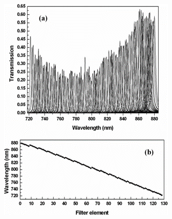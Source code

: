\begin{frame}[c]
\begin{columns}
\begin{column}{.3\textwidth}
\begin{figure}[H]
                \includegraphics[width=1.\textwidth]{figures/Concept of a high-resolution miniature spectrometer using an integrated filter array_2.png} %
            \end{figure}
        \end{column}
    \end{columns}
\end{frame}


